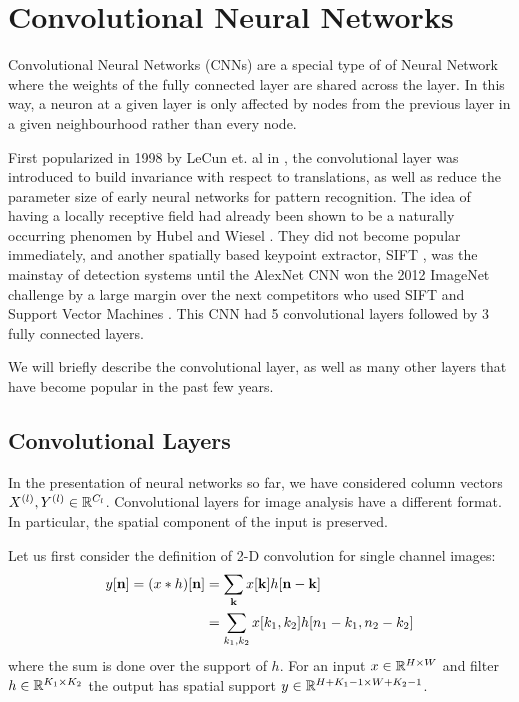 \section{Convolutional Neural Networks}
Convolutional Neural Networks (CNNs) are a special type of of Neural Network where the
weights of the fully connected layer are shared across the layer. 
In this way, a neuron at a given layer is only affected by
nodes from the previous layer in a given neighbourhood rather than every node.

First popularized in 1998 by LeCun et. al in \cite{lecun_gradient-based_1998},
the convolutional layer was introduced to build invariance with respect to
translations, as well as reduce the parameter size of early neural networks for
pattern recognition. The idea of having a locally receptive field had already
been shown to be a naturally occurring phenomen by Hubel and Wiesel
\cite{hubel_receptive_1962}. They did not become popular immediately, and
another spatially based keypoint extractor, SIFT \cite{lowe_distinctive_2004},
was the mainstay of detection systems until the AlexNet CNN
\cite{krizhevsky_imagenet_2012} won the 2012 ImageNet challenge
\cite{russakovsky_imagenet_2014} by a large margin over the next competitors who
used SIFT and Support Vector Machines \cite{cortes_support-vector_1995}. This
CNN had 5 convolutional layers followed by 3 fully connected layers.

We will briefly describe the convolutional layer, as well as many other layers
that have become popular in the past few years.

\subsection{Convolutional Layers}\label{sec:ch2:conv_layers}
In the presentation of neural networks so far, we have considered column vectors 
$X^{(l)},Y^{(l)} \in \reals[C_{l}]$. Convolutional layers for image analysis
have a different format. In particular, the spatial component of the input is
preserved. 

Let us first consider the definition of 2-D convolution for single channel
images:
\begin{align}
  y[\nn] = (x\conv h)[\nn] &= \sum_{\mathbf{k}} x[\mathbf{k}]h[\nn-\mathbf{k}] \label{eq:ch2:conv1}\\
                           &= \sum_{k_1, k_2} x[k_1,k_2]h[n_1-k_1, n_2-k_2]
\end{align}
where the sum is done over the support of $h$. For an input $x\in \reals[H\x W]$
and filter $h\in \reals[K_1\x K_2]$ the output has spatial support $y\in
\reals[H+K_1-1 \x W+K_2-1]$. 

